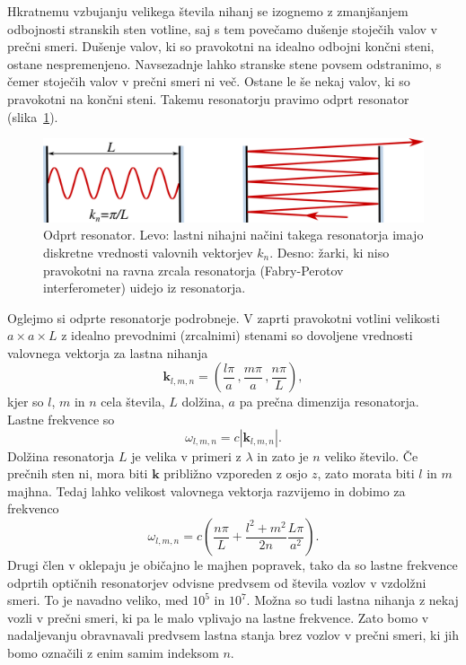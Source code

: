 \noindent
Hkratnemu vzbujanju velikega števila nihanj se izognemo z zmanjšanjem odbojnosti
stranskih sten votline, saj s tem povečamo dušenje stoječih valov v prečni smeri.
Dušenje valov, ki so pravokotni na idealno odbojni končni steni, ostane nespremenjeno.
Navsezadnje lahko stranske stene povsem odstranimo, s čemer stoječih valov v prečni smeri
ni več. Ostane le še nekaj valov, ki so pravokotni na končni
steni. Takemu resonatorju pravimo odprt resonator 
(slika~\ref{fig:Odprt_resonator}).\\
\begin{figure}[h]
\centering
\includegraphics[width=10truecm]{slike/04_Odprt_resonator.png}
\caption{Odprt resonator. Levo: lastni nihajni načini takega resonatorja imajo 
diskretne vrednosti valovnih vektorjev $k_{n}$. Desno: žarki, ki niso pravokotni na ravna zrcala
resonatorja (Fabry-Perotov interferometer) uidejo iz resonatorja.}
\label{fig:Odprt_resonator}
\end{figure}

\noindent
Oglejmo si odprte resonatorje podrobneje. V zaprti pravokotni votlini velikosti
$a\times a\times L$ z idealno prevodnimi (zrcalnimi) stenami so dovoljene vrednosti
valovnega vektorja za lastna nihanja 
\begin{equation}
\mathbf{k}_{l,m,n}=\left(\frac{l\pi}{a}\,,\frac{m\pi}{a}\,,\frac{n\pi}{L}\right),\label{eq:k-votlina}
\end{equation}
 kjer so $l$, $m$ in $n$ cela števila, $L$ dolžina, $a$ pa prečna
dimenzija resonatorja. Lastne frekvence so 
\begin{equation}
\omega_{l,m,n}=c|\mathbf{k}_{l,m,n}|.\label{eq:omega-votlina}
\end{equation}
Dolžina resonatorja $L$ je velika v primeri z $\lambda$ in zato je $n$
veliko število. Če prečnih sten ni, mora biti $\mathbf{k}$ približno
vzporeden z osjo $z$, zato morata biti $l$ in $m$ majhna. Tedaj
lahko velikost valovnega vektorja razvijemo in dobimo za frekvenco
\begin{equation}
\omega_{l,m,n}=c\left(\frac{n\pi}{L}+\frac{l^{2}+m^{2}}{2n}\frac{L \pi}{a^{2}}\right).
\label{eq:delta-omega-resonator-razvoj}
\end{equation}
Drugi člen v oklepaju je običajno le majhen popravek, tako da so
lastne frekvence odprtih optičnih resonatorjev odvisne predvsem od
števila vozlov v vzdolžni smeri. To je navadno veliko, med $10^{5}$
in $10^{7}$. Možna so tudi lastna nihanja z nekaj vozli v prečni
smeri, ki pa le malo vplivajo na lastne frekvence. Zato bomo v nadaljevanju
obravnavali predvsem lastna stanja brez vozlov v prečni smeri, ki
jih bomo označili z enim samim indeksom $n$.\\

